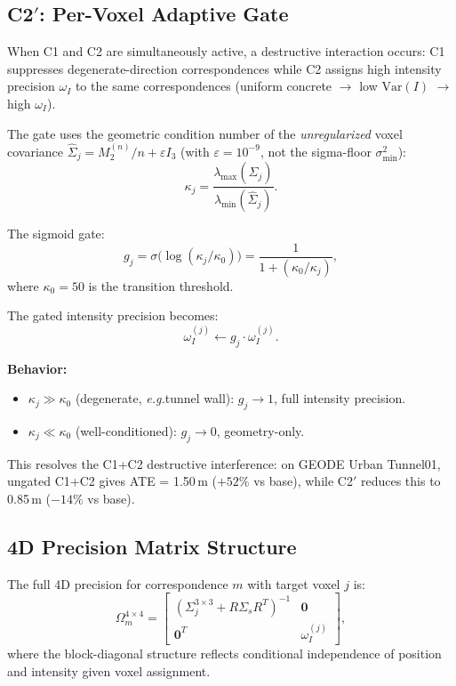 \documentclass[journal,letterpaper,10pt]{IEEEtran}
\newcommand{\eg}{\textit{e.g.}}
\begin{document}
\subsection{C2$'$: Per-Voxel Adaptive Gate}\label{app:c2p}

When C1 and C2 are simultaneously active, a destructive interaction occurs:
C1 suppresses degenerate-direction correspondences while C2 assigns high
intensity precision $\omega_I$ to the same correspondences (uniform
concrete $\to$ low $\mathrm{Var}(I)$ $\to$ high $\omega_I$).

The gate uses the geometric condition number of the \emph{unregularized}
voxel covariance $\hat{\Sigma}_j = M_2^{(n)}/n + \varepsilon I_3$
(with $\varepsilon = 10^{-9}$, not the sigma-floor $\sigma_{\min}^2$):
\begin{equation}
  \kappa_j = \frac{\lambda_{\max}(\hat{\Sigma}_j)}{\lambda_{\min}(\hat{\Sigma}_j)}.
\end{equation}

The sigmoid gate:
\begin{equation}
  g_j = \sigma\!\bigl(\log(\kappa_j / \kappa_0)\bigr)
  = \frac{1}{1 + (\kappa_0/\kappa_j)},
\end{equation}
where $\kappa_0 = 50$ is the transition threshold.

The gated intensity precision becomes:
\begin{equation}
  \omega_I^{(j)} \leftarrow g_j \cdot \omega_I^{(j)}.
\end{equation}

\textbf{Behavior:}
\begin{itemize}
  \item $\kappa_j \gg \kappa_0$ (degenerate, \eg tunnel wall):
    $g_j \to 1$, full intensity precision.
  \item $\kappa_j \ll \kappa_0$ (well-conditioned):
    $g_j \to 0$, geometry-only.
\end{itemize}

This resolves the C1+C2 destructive interference:
on GEODE Urban Tunnel01, ungated C1+C2 gives ATE = 1.50\,m ($+52\%$
vs base), while C2$'$ reduces this to 0.85\,m ($-14\%$ vs base).

\subsection{4D Precision Matrix Structure}\label{app:4d}

The full 4D precision for correspondence $m$ with target voxel $j$ is:
\begin{equation}
  \Omega_m^{4\times4} =
  \begin{bmatrix}
    (\Sigma_j^{3\times3} + R\Sigma_s R^T)^{-1} & \mathbf{0} \\
    \mathbf{0}^T & \omega_I^{(j)}
  \end{bmatrix},
\end{equation}
where the block-diagonal structure reflects conditional independence
of position and intensity given voxel assignment.
\end{document}
